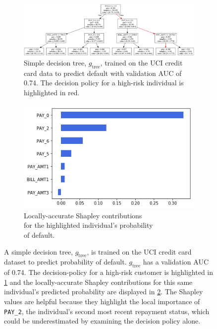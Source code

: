 \documentclass{article}
\begin{document}
\begin{figure}[ht!]
	\begin{subfigure}{.6\textwidth}
		\includegraphics[height=.45\linewidth, width=1.15\linewidth]{img/dt.png}
  		\caption{Simple decision tree, $g_{\text{tree}}$, trained on the UCI credit card data to predict default with validation AUC of 0.74. The decision policy for a high-risk individual is highlighted in red.}
  		\label{fig:dt}
	\end{subfigure}\hspace{50pt}
	\begin{subfigure}{.4\textwidth}
		\vspace{30pt}
  		\includegraphics[height=.5\linewidth, width=.8\linewidth]{img/shap.png}
  		\vspace{5pt}
  		\caption{Locally-accurate Shapley contributions\\ for the highlighted individual's probability\\ of default.}
  		\label{fig:shap}
	\end{subfigure}
	\caption{A simple decision tree, $g_{\text{tree}}$, is trained on the UCI credit card dataset to predict probability of default. $g_{\text{tree}}$ has a validation AUC of 0.74. The decision-policy for a high-risk customer is highlighted in \ref{fig:dt} and the locally-accurate Shapley contributions for this same individual's predicted probability are displayed in \ref{fig:shap}. The Shapley values are helpful because they highlight the local importance of \texttt{PAY\_2}, the individual's second most recent repayment status, which could be underestimated by examining the decision policy alone.}
	\label{fig:dt_shap}
\end{figure}
\end{document}
